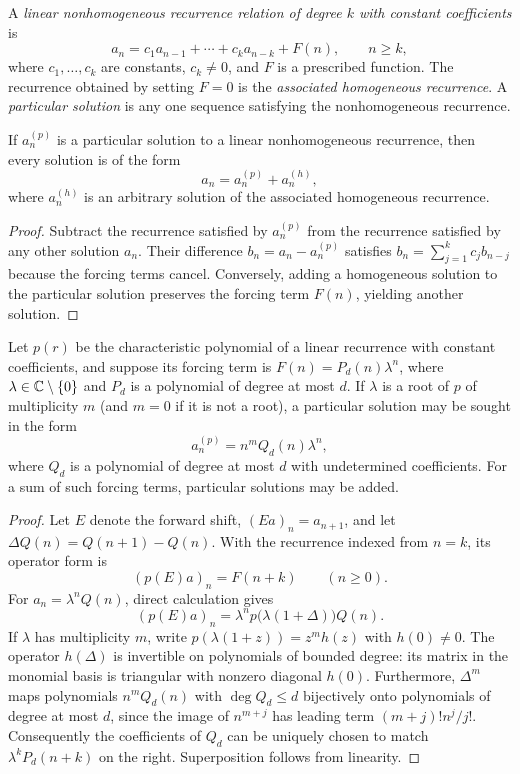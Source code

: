\documentclass[11pt, oneside]{article}
\begin{document}
\begin{definition}
A \emph{linear nonhomogeneous recurrence relation of degree $k$ with constant coefficients} is
\[
a_n=c_1a_{n-1}+\cdots+c_ka_{n-k}+F(n), \qquad n\ge k,
\]
where $c_1, \ldots, c_k$ are constants, $c_k\ne0$, and $F$ is a prescribed function. The recurrence obtained by setting $F=0$ is the \emph{associated homogeneous recurrence}. A \emph{particular solution} is any one sequence satisfying the nonhomogeneous recurrence.
\end{definition}
\begin{theorem}\label{thm:particular}
If $a_n^{(p)}$ is a particular solution to a linear nonhomogeneous recurrence, then every solution is of the form
\[
a_n=a_n^{(p)}+a_n^{(h)},
\]
where $a_n^{(h)}$ is an arbitrary solution of the associated homogeneous recurrence.
\end{theorem}
\begin{proof}
Subtract the recurrence satisfied by $a_n^{(p)}$ from the recurrence satisfied by any other solution $a_n$. Their difference $b_n=a_n-a_n^{(p)}$ satisfies $b_n=\displaystyle\sum_{j=1}^kc_jb_{n-j}$ because the forcing terms cancel. Conversely, adding a homogeneous solution to the particular solution preserves the forcing term $F(n)$, yielding another solution.
\end{proof}

\begin{proposition}\label{prop:undetermined}
Let $p(r)$ be the characteristic polynomial of a linear recurrence with constant coefficients, and suppose its forcing term is $F(n)=P_d(n)\lambda^n$, where $\lambda\in\mathbb{C}\setminus\{0\}$ and $P_d$ is a polynomial of degree at most $d$. If $\lambda$ is a root of $p$ of multiplicity $m$ (and $m=0$ if it is not a root), a particular solution may be sought in the form
\[
a_n^{(p)}=n^mQ_d(n)\lambda^n,
\]
where $Q_d$ is a polynomial of degree at most $d$ with undetermined coefficients. For a sum of such forcing terms, particular solutions may be added.
\end{proposition}
\begin{proof}
Let $E$ denote the forward shift, $(Ea)_n=a_{n+1}$, and let $\Delta Q(n)=Q(n+1)-Q(n)$. With the recurrence indexed from $n=k$, its operator form is
\[
(p(E)a)_n=F(n+k)\qquad(n\ge0).
\]
For $a_n=\lambda^nQ(n)$, direct calculation gives
\[
(p(E)a)_n=\lambda^np\bigl(\lambda(1+\Delta)\bigr)Q(n).
\]
If $\lambda$ has multiplicity $m$, write $p(\lambda(1+z))=z^mh(z)$ with $h(0)\ne0$. The operator $h(\Delta)$ is invertible on polynomials of bounded degree: its matrix in the monomial basis is triangular with nonzero diagonal $h(0)$. Furthermore, $\Delta^m$ maps polynomials $n^mQ_d(n)$ with $\deg Q_d\le d$ bijectively onto polynomials of degree at most $d$, since the image of $n^{m+j}$ has leading term $(m+j)!n^j/j!$. Consequently the coefficients of $Q_d$ can be uniquely chosen to match $\lambda^kP_d(n+k)$ on the right. Superposition follows from linearity.
\end{proof}
\end{document}
